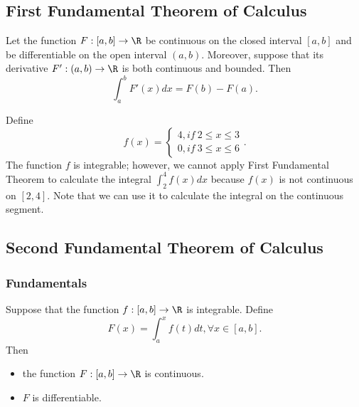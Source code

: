 \begin{refsection}
\subsection{First Fundamental Theorem of Calculus}
\begin{theorem}\cite[161]{fitzpatrick2006advanced}\label{ch:calculus:th:FirstFundamentalTheoremOfCalculus}Let the function $F:[a,b]\to \R$ be continuous on the closed interval $[a,b]$ and be differentiable on the open interval $(a,b)$. Moreover, suppose that its derivative $F':(a,b)\to \R$ is both continuous and bounded. 
	Then
	$$\int_a^b F'(x)dx = F(b) - F(a).$$
\end{theorem}


\begin{remark}\cite[163]{fitzpatrick2006advanced}
Define
$$f(x)=\begin{cases*}
4, if~ 2\leq x\leq 3\\
0, if~ 3\leq x \leq 6
\end{cases*}.$$
The function $f$ is integrable; however, we cannot apply First Fundamental Theorem to calculate the integral $\int_2^4 f(x)dx$ because $f(x)$ is not continuous on $[2,4]$. Note that we can use it to calculate the integral on the continuous segment.
\end{remark}

\subsection{Second Fundamental Theorem of Calculus}
\subsubsection{Fundamentals}
\begin{lemma}\cite[169]{fitzpatrick2006advanced}\label{ch:calculus:th:conuityOfIntegralFunction}
Suppose that the function $f:[a,b]\to \R$ is integrable. Define
$$F(x) = \int_a^x f(t)dt, \forall x\in [a,b].$$
Then 
\begin{itemize}
	\item the function $F:[a,b]\to \R$ is continuous.
	\item $F$ is differentiable.
\end{itemize}


\end{lemma}
\end{refsection}
